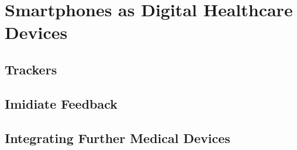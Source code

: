 \section{Smartphones as Digital Healthcare Devices}
\subsection{Trackers}
\subsection{Imidiate Feedback}
\subsection{Integrating Further Medical Devices}

